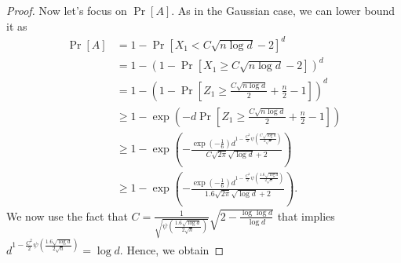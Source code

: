 \documentclass{article}
\begin{document}
\begin{proof}
Now let's focus on $\Pr[A]$. As in the Gaussian case, we can lower bound it as
\begin{align*}
\Pr[A]
& = 1 - \Pr[X_1 < C \sqrt{n \log d}-2]^d \\
& = 1 - (1-\Pr[X_1\ge C \sqrt{n \log d}-2])^d \\
& = 1 - (1-\Pr[Z_1\ge \frac{C \sqrt{n \log d}}{2} +\frac{n}{2}-1])^d \\
& \ge 1-\exp\left(-d \Pr[Z_1\ge \frac{C \sqrt{n \log d}}{2} +\frac{n}{2}-1] \right) \\
& \ge 1 - \exp\left(-\frac{\exp\left(-\frac{1}{6}\right) d^{1-\frac{C^2}{2} \psi\left(\frac{C \sqrt{\log d}}{2 \sqrt{n}}\right)}}{C \sqrt{2\pi} \sqrt{\log d}+2}\right) \\
& \ge 1 - \exp\left(-\frac{\exp\left(-\frac{1}{6}\right) d^{1-\frac{C^2}{2} \psi\left(\frac{1.6 \sqrt{\log d}}{2 \sqrt{n}}\right)}}{1.6 \sqrt{2\pi} \sqrt{\log d}+2}\right).
%
\end{align*}
We now use the fact that $C=\frac{1}{\sqrt{\psi\left(\frac{1.6 \sqrt{\log d}}{2 \sqrt{n}}\right)}}\sqrt{2- \frac{\log \log d}{\log d}}$ that implies $d^{1-\frac{C^2}{2} \psi\left(\frac{1.6 \sqrt{\log d}}{2 \sqrt{n}}\right)}=\log d$. Hence, we obtain

\end{proof}
\end{document}
